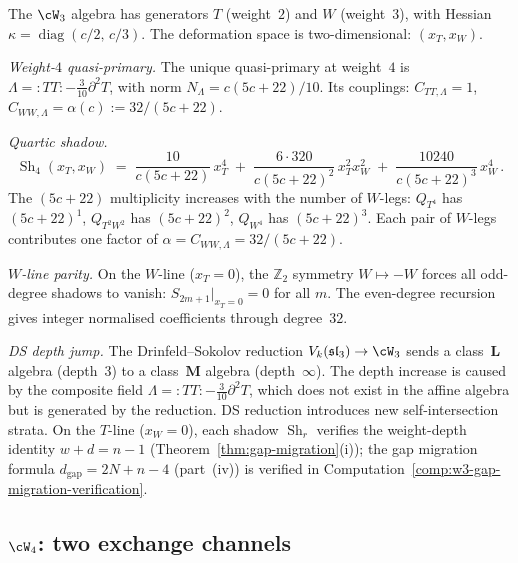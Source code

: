 \begin{computation}%
\label{comp:w3-shadow-tower}%
%
The $\cW_3$ algebra has generators $T$ (weight~$2$)
and $W$ (weight~$3$), with Hessian
$\kappa = \operatorname{diag}(c/2,\, c/3)$. The
deformation space is two-dimensional: $(x_T, x_W)$.

\smallskip
\noindent
\emph{Weight-$4$ quasi-primary.} The unique quasi-primary
at weight~$4$ is
$\Lambda = {:}TT{:} - \tfrac{3}{10}\partial^2 T$,
with norm $N_\Lambda = c(5c{+}22)/10$. Its couplings:
$C_{TT,\Lambda} = 1$,
$C_{WW,\Lambda} = \alpha(c) := 32/(5c{+}22)$.

\smallskip
\noindent
\emph{Quartic shadow.}
\begin{equation}\label{eq:w3-quartic}
 \operatorname{Sh}_4(x_T, x_W)
 \;=\;
 \frac{10}{c(5c{+}22)}\,x_T^4
 \;+\;
 \frac{6\cdot 320}{c(5c{+}22)^2}\,x_T^2 x_W^2
 \;+\;
 \frac{10240}{c(5c{+}22)^3}\,x_W^4\,.
\end{equation}
The $(5c{+}22)$ multiplicity increases with the number of
$W$-legs: $Q_{T^4}$ has $(5c{+}22)^1$,
$Q_{T^2W^2}$ has $(5c{+}22)^2$,
$Q_{W^4}$ has $(5c{+}22)^3$. Each pair of $W$-legs
contributes one factor of
$\alpha = C_{WW,\Lambda} = 32/(5c{+}22)$.

\smallskip
\noindent
\emph{$W$-line parity.}
On the $W$-line ($x_T = 0$), the $\mathbb{Z}_2$ symmetry
$W\mapsto -W$ forces all odd-degree shadows to vanish:
$S_{2m+1}|_{x_T=0} = 0$ for all $m$. The even-degree
recursion gives integer normalised coefficients through
degree~$32$.

\smallskip
\noindent
\emph{DS depth jump.}
The Drinfeld--Sokolov reduction
$V_k(\mathfrak{sl}_3) \to \cW_3$ sends a class~$\mathbf{L}$
algebra (depth~$3$) to a class~$\mathbf{M}$ algebra
(depth~$\infty$). The depth increase is caused by the
composite field $\Lambda = {:}TT{:} - \tfrac{3}{10}
\partial^2 T$, which does not exist in the affine algebra
but is generated by the reduction. DS reduction introduces
new self-intersection strata.
On the $T$-line ($x_W = 0$), each shadow $\operatorname{Sh}_r$ verifies the weight-depth identity $w + d = n - 1$ (Theorem~\ref{thm:gap-migration}(i)); the gap migration formula $d_{\mathrm{gap}} = 2N + n - 4$ (part~(iv)) is verified in Computation~\ref{comp:w3-gap-migration-verification}.
\end{computation}

\subsection{$\cW_4$: two exchange channels}%
\label{subsec:w4-shadow}%

